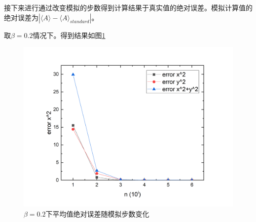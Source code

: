 \documentclass{article}
\begin{document}
	
	接下来进行通过改变模拟的步数得到计算结果于真实值的绝对误差。模拟计算值的绝对误差为$ |\langle A\rangle-\langle A\rangle_{standard}| $。
	
	
		取$ \beta=0.2 $情况下。得到结果如图\ref{fig:4}
	\begin{figure}[!h]
		
		\centering
		\includegraphics[scale=0.5]{error02}
		\caption{\heiti{}$ \beta=0.2 $下平均值绝对误差随模拟步数变化}
		\label{fig:4}
	\end{figure}
	
\end{document}
